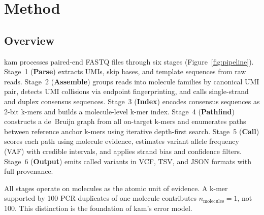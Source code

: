 \section{Method}
\label{sec:method}

\subsection{Overview}
\label{sec:method:overview}

kam processes paired-end FASTQ files through six stages (Figure~\ref{fig:pipeline}).
Stage~1 (\textbf{Parse}) extracts UMIs, skip bases, and template sequences from raw reads.
Stage~2 (\textbf{Assemble}) groups reads into molecule families by canonical UMI pair, detects UMI collisions via endpoint fingerprinting, and calls single-strand and duplex consensus sequences.
Stage~3 (\textbf{Index}) encodes consensus sequences as 2-bit k-mers and builds a molecule-level k-mer index.
Stage~4 (\textbf{Pathfind}) constructs a de~Bruijn graph from all on-target k-mers and enumerates paths between reference anchor k-mers using iterative depth-first search.
Stage~5 (\textbf{Call}) scores each path using molecule evidence, estimates variant allele frequency (VAF) with credible intervals, and applies strand bias and confidence filters.
Stage~6 (\textbf{Output}) emits called variants in VCF, TSV, and JSON formats with full provenance.

All stages operate on molecules as the atomic unit of evidence.
A k-mer supported by 100 PCR duplicates of one molecule contributes $n_\text{molecules} = 1$, not 100.
This distinction is the foundation of kam's error model.

